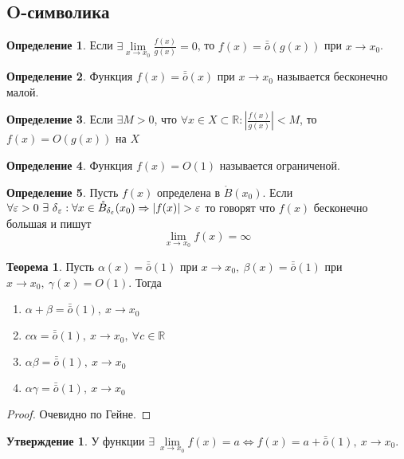 \documentclass[a4paper, 12pt]{article}
\newcommand{\R}{\mathbb{R}}
\newcommand{\Bo}{\mathring{B}}
\renewcommand{\epsilon}{\varepsilon}
\newcommand{\om}{\bar{\bar{o}}}
\theoremstyle{definition}
\newtheorem*{definition}{Определение}
\newtheorem*{theorem}{Теорема}
\newtheorem*{statement}{Утверждение}
\begin{document}
        \subsection{O-символика}
        \begin{definition}
            Если $\exists \lim\limits_{x\to x_0}\frac{f(x)}{g(x)}=0$, то $f(x)=\om(g(x))$ при $x\to x_0$.
        \end{definition} 
        \begin{definition}
            Функция $f(x)=\om(x)$ при $x\to x_0$ называется бесконечно малой.
        \end{definition}
        \begin{definition}
            Если $\exists M>0$, что $\forall x\in X\subset \R: |\frac{f(x)}{g(x)}|<M$, то $f(x)=O(g(x))$ на $X$
        \end{definition} 
        \begin{definition}
            Функция $f(x)=O(1)$ называется ограниченой.
        \end{definition}
        \begin{definition}
            Пусть $f(x)$ определена в $\Bo(x_0)$. Если $\forall \epsilon>0\ \exists\ \delta{_\epsilon}:\\
            \forall x\in \Bo_{\delta_{\epsilon}}(x_0) \Rightarrow |f(x)|>\epsilon$ то говорят что $f(x)$ бесконечно большая и пишут
            \[\lim\limits_{x\to x_0}f(x)=\infty\]
        \end{definition}
        \begin{theorem}
            Пусть $\alpha(x)=\om(1)$ при $x\to x_0,\ \beta(x)=\om(1)$ при $x\to x_0,\ \gamma(x)=O(1)$. Тогда
            \begin{enumerate}
                \item $\alpha+\beta=\om(1),\ x\to x_0$
                \item $c \alpha=\om(1),\ x\to x_0,\ \forall c\in \R$
                \item $\alpha\beta=\om(1),\ x\to x_0$
                \item $\alpha\gamma=\om(1),\ x\to x_0$
            \end{enumerate}
        \end{theorem} 
        \begin{proof}
            Очевидно по Гейне.
        \end{proof} 
        \begin{statement}
            У функции $\exists\ \lim\limits_{x\to x_0}f(x)=a\Leftrightarrow f(x)=a+\om(1),\ x\to x_0$.
        \end{statement} 
\end{document}
